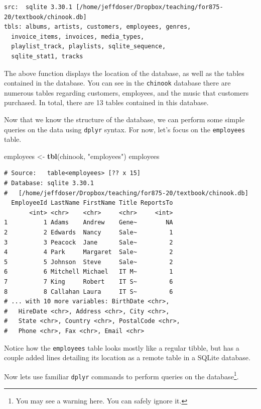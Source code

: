 \documentclass[
]{krantz}
\makeatletter
\newenvironment{Shaded}{\begin{snugshade}}{\end{snugshade}}
\newcommand{\KeywordTok}[1]{\textcolor[rgb]{0.27,0.27,0.27}{\textbf{#1}}}
\newcommand{\NormalTok}[1]{#1}
\newcommand{\StringTok}[1]{\textcolor[rgb]{0.5,0.5,0.5}{#1}}
\newenvironment{kframe}{%
\medskip{}
\setlength{\fboxsep}{.8em}
 \def\at@end@of@kframe{}%
 \ifinner\ifhmode%
  \def\at@end@of@kframe{\end{minipage}}%
  \begin{minipage}{\columnwidth}%
 \fi\fi%
 \def\FrameCommand##1{\hskip\@totalleftmargin \hskip-\fboxsep
 \colorbox{shadecolor}{##1}\hskip-\fboxsep
     \hskip-\linewidth \hskip-\@totalleftmargin \hskip\columnwidth}%
 \MakeFramed {\advance\hsize-\width
   \@totalleftmargin\z@ \linewidth\hsize
   \@setminipage}}%
 {\par\unskip\endMakeFramed%
 \at@end@of@kframe}
\renewenvironment{Shaded}{\begin{kframe}}{\end{kframe}}
\makeatother
\begin{document}
\begin{verbatim}
src:  sqlite 3.30.1 [/home/jeffdoser/Dropbox/teaching/for875-20/textbook/chinook.db]
tbls: albums, artists, customers, employees, genres,
  invoice_items, invoices, media_types,
  playlist_track, playlists, sqlite_sequence,
  sqlite_stat1, tracks
\end{verbatim}

The above function displays the location of the database, as well as the tables contained in the database. You can see in the \texttt{chinook} database there are numerous tables regarding customers, employees, and the music that customers purchased. In total, there are 13 tables contained in this database.

Now that we know the structure of the database, we can perform some simple queries on the data using \texttt{dplyr} syntax. For now, let's focus on the \texttt{employees} table.

\begin{Shaded}
\begin{Highlighting}[]
\NormalTok{employees \textless{}{-}}\StringTok{ }\KeywordTok{tbl}\NormalTok{(chinook, }\StringTok{"employees"}\NormalTok{)}
\NormalTok{employees}
\end{Highlighting}
\end{Shaded}

\begin{verbatim}
# Source:   table<employees> [?? x 15]
# Database: sqlite 3.30.1
#   [/home/jeffdoser/Dropbox/teaching/for875-20/textbook/chinook.db]
  EmployeeId LastName FirstName Title ReportsTo
       <int> <chr>    <chr>     <chr>     <int>
1          1 Adams    Andrew    Gene~        NA
2          2 Edwards  Nancy     Sale~         1
3          3 Peacock  Jane      Sale~         2
4          4 Park     Margaret  Sale~         2
5          5 Johnson  Steve     Sale~         2
6          6 Mitchell Michael   IT M~         1
7          7 King     Robert    IT S~         6
8          8 Callahan Laura     IT S~         6
# ... with 10 more variables: BirthDate <chr>,
#   HireDate <chr>, Address <chr>, City <chr>,
#   State <chr>, Country <chr>, PostalCode <chr>,
#   Phone <chr>, Fax <chr>, Email <chr>
\end{verbatim}

Notice how the \texttt{employees} table looks mostly like a regular tibble, but has a couple added lines detailing its location as a remote table in a SQLite database.

Now lets use familiar \texttt{dplyr} commands to perform queries on the database\footnote{You may see a warning here. You can safely ignore it.}.
\end{document}
